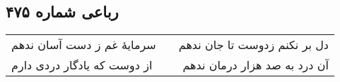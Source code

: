 \begin{center}
\section*{رباعی شماره ۴۷۵}
\label{sec:sh475}
\begin{longtable}{l p{0.5cm} r}
سرمایهٔ غم ز دست آسان ندهم
&&
دل بر نکنم زدوست تا جان ندهم
\\
از دوست که یادگار دردی دارم
&&
آن درد به صد هزار درمان ندهم
\\
\end{longtable}
\end{center}
